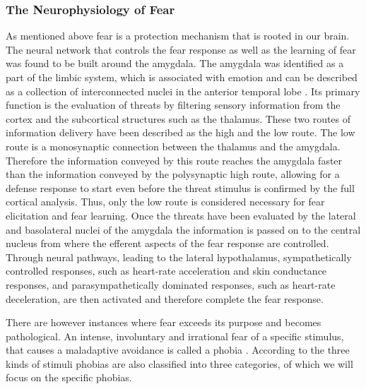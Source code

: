 \subsubsection{The Neurophysiology of Fear} 
As mentioned above fear is a protection mechanism that is rooted in our brain. The neural network that controls the fear response as well as the learning of fear was found to be built around the amygdala. The amygdala was identified as a part of the limbic system, which is associated with emotion and can be described as a collection of interconnected nuclei in the anterior temporal lobe \cite{FINK2010}. Its primary function is the evaluation of threats by filtering sensory information from the cortex and the subcortical structures such as the thalamus. These two routes of information delivery have been described as the high and the low route. The low route is a monosynaptic connection between the thalamus and the amygdala. Therefore the information conveyed by this route reaches the amygdala faster than the information conveyed by the polysynaptic high route, allowing for a defense response to start even before the threat stimulus is confirmed by the full cortical analysis. Thus, only the low route is considered necessary for fear elicitation and fear learning. Once the threats have been evaluated by the lateral and basolateral nuclei of the amygdala the information is passed on to the central nucleus from where the efferent aspects of the fear response are controlled. Through neural pathways, leading to the lateral hypothalamus,  sympathetically controlled responses, such as heart-rate acceleration and skin conductance responses, and parasympathetically dominated responses, such as heart-rate deceleration, are then activated and therefore complete the fear response.

There are however instances where fear exceeds its purpose and becomes pathological. An intense, involuntary and irrational fear of a specific stimulus, that causes a maladaptive avoidance is called a phobia \cite{FINK2010}. According to the three kinds of stimuli phobias are also classified into three categories, of which we will focus on the specific phobias. 

